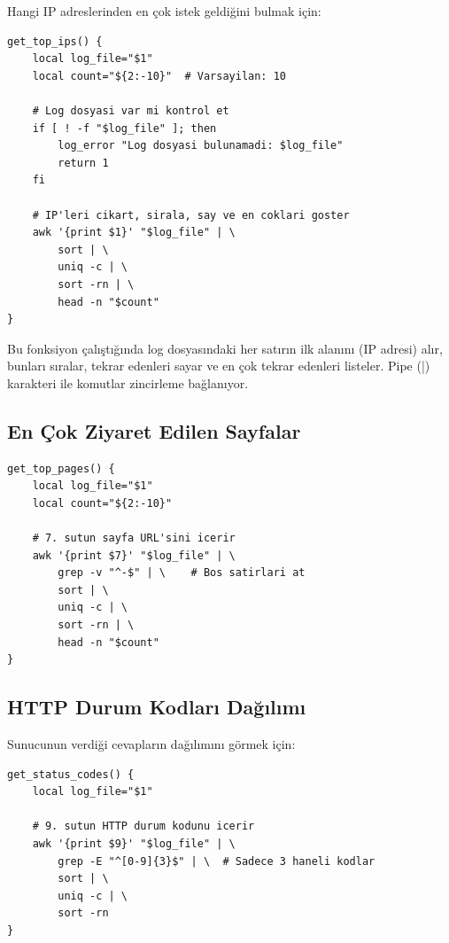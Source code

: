 \documentclass[12pt,a4paper]{report}
\begin{document}
Hangi IP adreslerinden en çok istek geldiğini bulmak için:

\begin{lstlisting}[style=bashstyle,caption={IP Analizi Fonksiyonu}]
get_top_ips() {
    local log_file="$1"
    local count="${2:-10}"  # Varsayilan: 10
    
    # Log dosyasi var mi kontrol et
    if [ ! -f "$log_file" ]; then
        log_error "Log dosyasi bulunamadi: $log_file"
        return 1
    fi
    
    # IP'leri cikart, sirala, say ve en coklari goster
    awk '{print $1}' "$log_file" | \
        sort | \
        uniq -c | \
        sort -rn | \
        head -n "$count"
}
\end{lstlisting}

Bu fonksiyon çalıştığında log dosyasındaki her satırın ilk alanını (IP adresi) alır, bunları sıralar, tekrar edenleri sayar ve en çok tekrar edenleri listeler. Pipe (|) karakteri ile komutlar zincirleme bağlanıyor.

\subsection{En Çok Ziyaret Edilen Sayfalar}

\begin{lstlisting}[style=bashstyle,caption={Sayfa Analizi Fonksiyonu}]
get_top_pages() {
    local log_file="$1"
    local count="${2:-10}"
    
    # 7. sutun sayfa URL'sini icerir
    awk '{print $7}' "$log_file" | \
        grep -v "^-$" | \    # Bos satirlari at
        sort | \
        uniq -c | \
        sort -rn | \
        head -n "$count"
}
\end{lstlisting}

\subsection{HTTP Durum Kodları Dağılımı}

Sunucunun verdiği cevapların dağılımını görmek için:

\begin{lstlisting}[style=bashstyle,caption={Durum Kodu Analizi}]
get_status_codes() {
    local log_file="$1"
    
    # 9. sutun HTTP durum kodunu icerir
    awk '{print $9}' "$log_file" | \
        grep -E "^[0-9]{3}$" | \  # Sadece 3 haneli kodlar
        sort | \
        uniq -c | \
        sort -rn
}
\end{lstlisting}
\end{document}
